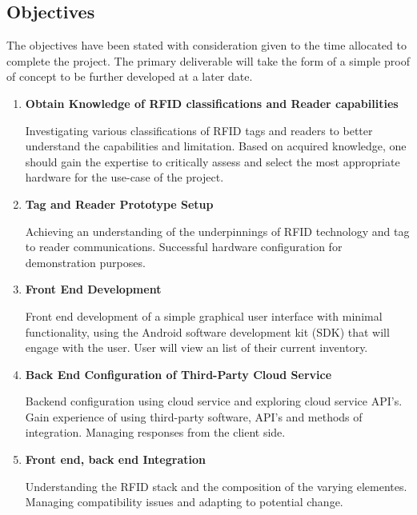 \documentclass[a4paper, 11pt]{article}
\begin{document}
\subsection{Objectives}
The objectives have been stated with consideration given to the time allocated to complete the project. The primary deliverable will take the form of a simple proof of concept to be further developed at a later date. 

\begin{enumerate}

   \item \textbf{Obtain Knowledge of RFID classifications and Reader capabilities}
   	\begin{flushleft}Investigating various classifications of RFID tags and readers to better understand the capabilities and limitation. Based on acquired knowledge, one should gain the expertise to critically assess and select the most appropriate hardware for the use-case of the project.
  	\end{flushleft}
	
   \item \textbf{Tag and Reader Prototype Setup}
   	\begin{flushleft}Achieving an understanding of the underpinnings of RFID technology and tag to reader communications. Successful hardware configuration for demonstration purposes.
  	\end{flushleft}
  
   \item \textbf{Front End Development}
   	\begin{flushleft}Front end development of a simple graphical user interface with minimal functionality, using the Android software development kit (SDK) that will engage with the user. User will view an list of their current inventory.
		  \end{flushleft}
  
   \item \textbf{Back End Configuration of Third-Party Cloud Service}
   	\begin{flushleft}
	Backend configuration using cloud service and exploring cloud service API's. Gain experience of using third-party software, API's and methods of integration. Managing responses from the client side. 
	 \end{flushleft}
	 
	    \item \textbf{Front end, back end Integration}
   	\begin{flushleft}Understanding the RFID stack and the composition of the varying elementes. Managing compatibility issues and adapting to potential change. 
  	\end{flushleft}
 

\end{enumerate}
\end{document}
